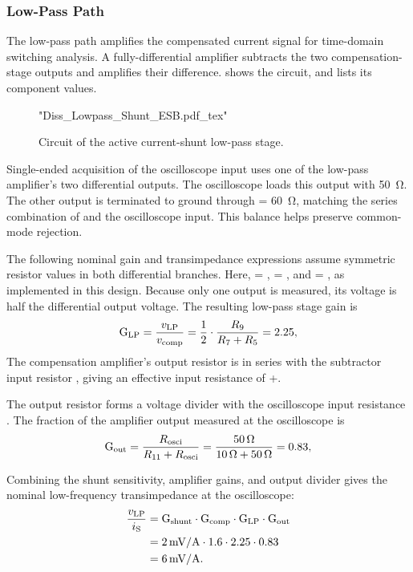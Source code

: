 \subsubsection*{Low-Pass Path}
The low-pass path amplifies the compensated current signal for time-domain switching analysis.
A fully-differential amplifier subtracts the two compensation-stage outputs and amplifies their difference.
 shows the circuit, and  lists its component values.

\begin{figure}[ht]
	\centering
	{"Diss_Lowpass_Shunt_ESB.pdf_tex"}
	\caption{Circuit of the active current-shunt low-pass stage.}\label{fig:ESBLowpass}
\end{figure}
\FloatBarrier

Single-ended acquisition of the oscilloscope input uses one of the low-pass amplifier's two differential outputs.
The oscilloscope loads this output with \SI{50}{\ohm}.
The other output is terminated to ground through  = \SI{60}{\ohm}, matching the series combination of  and the oscilloscope input.
This balance helps preserve common-mode rejection.

The following nominal gain and transimpedance expressions assume symmetric resistor values in both differential branches.
Here,  = ,  = , and  = , as implemented in this design.
Because only one output is measured, its voltage is half the differential output voltage.
The resulting low-pass stage gain is
\begin{equation}
	\text{G}_{\text{LP}} = \frac{{v}_{\mathrm{LP}}}{{v}_{\mathrm{comp}}} = \frac{1}{2}\cdot\frac{{R}_{\mathrm{9}}}{{R}_{\mathrm{7}}+{R}_{\mathrm{5}}} = 2.25,
\end{equation}
The compensation amplifier's output resistor  is in series with the subtractor input resistor , giving an effective input resistance of +.

The output resistor  forms a voltage divider with the oscilloscope input resistance .
The fraction of the amplifier output measured at the oscilloscope is
\begin{equation}
	\text{G}_{\text{out}} = \frac{{R}_{\mathrm{osci}}}{{R}_{\mathrm{11}} + {R}_{\mathrm{osci}}} = \frac{\SI{50}{\Omega}}{\SI{10}{\Omega} + \SI{50}{\Omega}} = 0.83,
\end{equation}

Combining the shunt sensitivity, amplifier gains, and output divider gives the nominal low-frequency transimpedance at the oscilloscope:
\begin{align}
	\frac{{v}_{\mathrm{LP}}}{{i}_{\mathrm{S}}} &= \text{G}_{\text{shunt}}\cdot\text{G}_{\text{comp}}\cdot\text{G}_{\text{LP}}\cdot\text{G}_{\text{out}} \\
				&= \SI{2}{mV/A}\cdot 1.6\cdot 2.25\cdot 0.83 \\
				&= \SI{6}{mV/A}.
\end{align}

